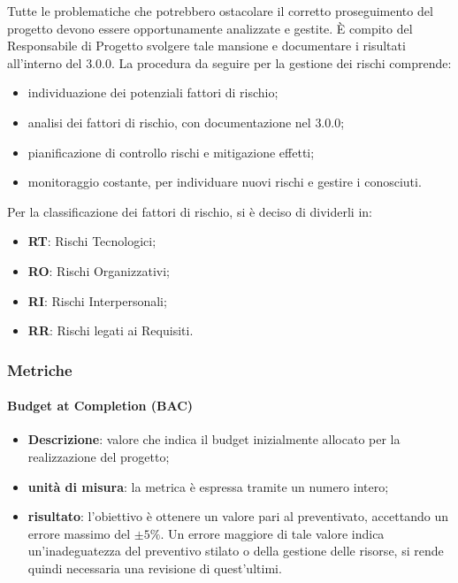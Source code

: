 			Tutte le problematiche che potrebbero ostacolare il corretto proseguimento del progetto devono essere opportunamente analizzate e gestite. È compito del Responsabile di Progetto svolgere tale mansione e documentare i risultati all'interno del \PdP{} {3.0.0}. La procedura da seguire per la gestione dei rischi comprende:
			\begin{itemize}
				\item individuazione dei potenziali fattori di rischio;
				\item analisi dei fattori di rischio, con documentazione nel \PdP{} {3.0.0};
				\item pianificazione di controllo rischi e mitigazione effetti;
				\item monitoraggio costante, per individuare nuovi rischi e gestire i conosciuti.
			\end{itemize}
			Per la classificazione dei fattori di rischio, si è deciso di dividerli in:
			\begin{itemize}
				\item \textbf{RT}: Rischi Tecnologici;
				\item \textbf{RO}: Rischi Organizzativi;
				\item \textbf{RI}: Rischi Interpersonali;
				\item \textbf{RR}: Rischi legati ai Requisiti.
			\end{itemize}
		\subsubsection{Metriche}
				\paragraph{Budget at Completion (BAC)}
					\begin{itemize}
						\item \textbf{Descrizione}: valore che indica il budget inizialmente allocato per la realizzazione del progetto;
						\item \textbf{unità di misura}: la metrica è espressa tramite un numero intero;
						\item \textbf{risultato}: l'obiettivo è ottenere un valore pari al preventivato, accettando un errore massimo del $\pm{}5\%$. Un errore maggiore di tale valore indica un'inadeguatezza del preventivo stilato o della gestione delle risorse, si rende quindi necessaria una revisione di quest'ultimi.
					\end{itemize}
